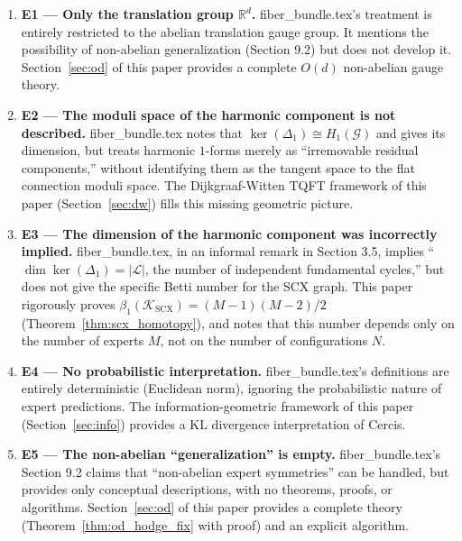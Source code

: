 \documentclass[12pt,a4paper]{article}
\theoremstyle{definition}
\theoremstyle{remark}
\theoremstyle{definition}
\newcommand{\R}{\mathbb{R}}
\newcommand{\grph}{\mathcal{G}}
\newcommand{\Lone}{\Delta_1}
\newcommand{\ZBetti}{\beta_1}
\begin{document}
\begin{enumerate}[label=E\arabic*:, leftmargin=*]
    \item \textbf{E1 — Only the translation group $\R^d$.}
    fiber\_bundle.tex's treatment is entirely restricted to the abelian translation gauge group.
    It mentions the possibility of non-abelian generalization (Section 9.2) but does not develop it.
    Section~\ref{sec:od} of this paper provides a complete $O(d)$ non-abelian gauge theory.

    \item \textbf{E2 — The moduli space of the harmonic component is not described.}
    fiber\_bundle.tex notes that $\ker(\Lone) \cong H_1(\grph)$ and gives its dimension,
    but treats harmonic $1$-forms merely as ``irremovable residual components,''
    without identifying them as the tangent space to the flat connection moduli space.
    The Dijkgraaf-Witten TQFT framework of this paper (Section~\ref{sec:dw}) fills this missing geometric picture.

    \item \textbf{E3 — The dimension of the harmonic component was incorrectly implied.}
    fiber\_bundle.tex, in an informal remark in Section 3.5, implies ``$\dim \ker(\Lone) = |\mathcal{L}|$, the number of independent fundamental cycles,''
    but does not give the specific Betti number for the SCX graph.
    This paper rigorously proves $\ZBetti(\mathcal{K}_{\text{SCX}}) = (M-1)(M-2)/2$ (Theorem~\ref{thm:scx_homotopy}),
    and notes that this number depends only on the number of experts $M$, not on the number of configurations $N$.

    \item \textbf{E4 — No probabilistic interpretation.}
    fiber\_bundle.tex's definitions are entirely deterministic (Euclidean norm),
    ignoring the probabilistic nature of expert predictions.
    The information-geometric framework of this paper (Section~\ref{sec:info}) provides a KL divergence interpretation of Cercis.

    \item \textbf{E5 — The non-abelian ``generalization'' is empty.}
    fiber\_bundle.tex's Section 9.2 claims that ``non-abelian expert symmetries'' can be handled,
    but provides only conceptual descriptions, with no theorems, proofs, or algorithms.
    Section~\ref{sec:od} of this paper provides a complete theory (Theorem~\ref{thm:od_hodge_fix} with proof) and an explicit algorithm.
\end{enumerate}
\end{document}

